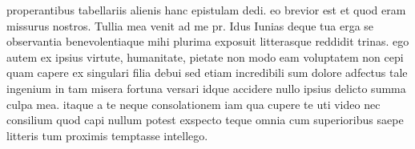


 properantibus tabellariis alienis hanc epistulam dedi. eo brevior est et quod eram missurus nostros. Tullia mea venit ad me pr. Idus Iunias deque tua erga se observantia benevolentiaque mihi plurima exposuit litterasque reddidit trinas. ego autem ex ipsius virtute, humanitate, pietate non modo eam voluptatem non cepi quam capere ex singulari filia debui sed etiam incredibili sum dolore adfectus tale ingenium in tam misera fortuna versari idque accidere nullo ipsius delicto summa culpa mea. itaque a te neque consolationem iam qua cupere te uti video nec consilium quod capi nullum potest exspecto teque omnia cum superioribus saepe litteris tum proximis temptasse intellego.
